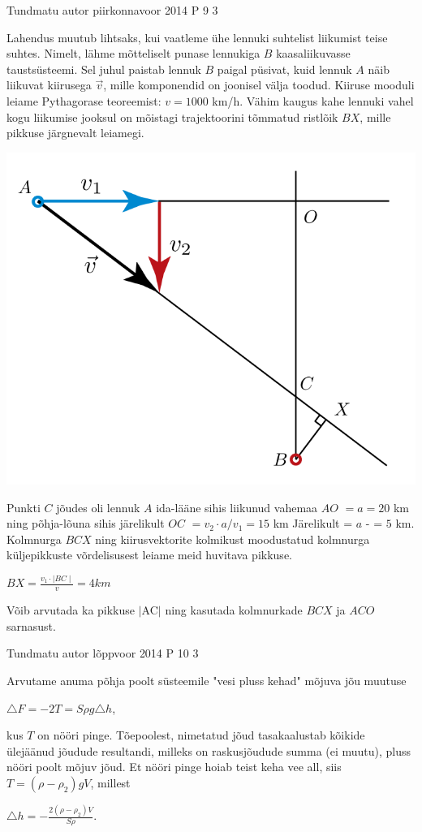\documentclass[11pt]{article}
\begin{document}
{%
{Tundmatu autor} %
{piirkonnavoor} %
{2014} %
{P 9} %
{3} %
{

\ifSolution
Lahendus muutub lihtsaks, kui vaatleme ühe lennuki suhtelist liikumist teise suhtes. Nimelt, lähme mõtteliselt punase lennukiga $B$ kaasaliikuvasse taustsüsteemi. Sel juhul paistab lennuk $B$ paigal püsivat, kuid lennuk $A$ näib liikuvat kiirusega $\vec{v}$, mille komponendid on joonisel välja toodud. Kiiruse mooduli leiame Pythagorase teoreemist: $v = 1000$ km/h. Vähim kaugus kahe lennuki vahel kogu liikumise jooksul on mõistagi trajektoorini tõmmatud ristlõik $BX$, mille pikkuse järgnevalt leiamegi.
\begin{center}
	\includegraphics[width=0.5\linewidth]{2014-v2p-09-lah.png}
\end{center}
Punkti $C$ jõudes oli lennuk $A$ ida-lääne sihis liikunud vahemaa \textbar$AO$\textbar$ $ $= a = 20$ km ning põhja-lõuna sihis järelikult \textbar $OC$\textbar $ $ $= v_2 \cdot a/v_1 = 15$ km
Järelikult \textbar = $a$ - \textbar = $5$ km.
Kolmnurga $BCX$ ning kiirusvektorite kolmikust moodustatud kolmnurga küljepikkuste võrdelisusest leiame meid huvitava pikkuse.
\begin{center}
\textbar $BX$\textbar $= \frac {v_1\cdot\mid{BC}\mid}{v} = 4 km$
\end{center}
Võib arvutada ka pikkuse $\mid$AC$\mid$ ning kasutada kolmnurkade $BCX$ ja $ACO$ sarnasust.
\fi
}

{Tundmatu autor} %
{lõppvoor} %
{2014} %
{P 10} %
{3} %
{

\ifSolution
Arvutame anuma põhja poolt süsteemile "vesi pluss kehad" mõjuva jõu muutuse
\begin{center}
$\triangle F = -2T = S \rho g \triangle h$,
\end{center}
kus $T$ on nööri pinge. Tõepoolest, nimetatud jõud tasakaalustab kõikide ülejäänud jõudude resultandi, milleks on raskusjõudude summa (ei muutu), pluss nööri poolt mõjuv jõud. Et nööri pinge hoiab teist keha vee all, siis $T = (\rho - \rho_2)gV$, millest
\begin{center}
$\triangle h = -\frac{2(\rho - \rho_2) V}{S \rho}$.
\end{center}
\fi
}

}
\end{document}
